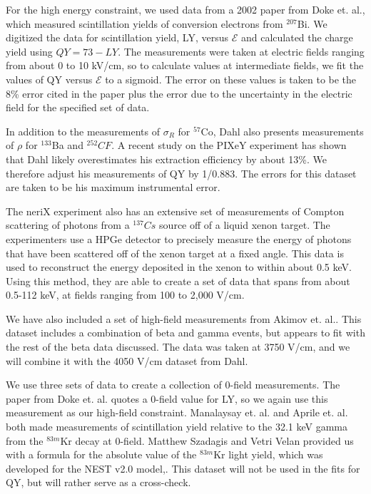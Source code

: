 For the high energy constraint, we used data from a 2002 paper from Doke et. al., which measured scintillation yields of conversion electrons from $^{207}$Bi\cite{doke2002}. We digitized the data for scintillation yield, LY, versus $\mathcal{E}$ and calculated the charge yield using $QY=73-LY$. The measurements were taken at electric fields ranging from about 0 to 10 kV/cm, so to calculate values at intermediate fields, we fit the values of QY versus $\mathcal{E}$ to a sigmoid. The error on these values is taken to be the 8\% error cited in the paper plus the error due to the uncertainty in the electric field for the specified set of data.

In addition to the measurements of $\sigma_R$ for $^{57}$Co, Dahl also presents measurements of $\rho$ for $^{133}$Ba and $^{252}CF$\cite{dahl}. A recent study on the PIXeY experiment has shown that Dahl likely overestimates his extraction efficiency by about 13\%\cite{pixey_extraction}. We therefore adjust his measurements of QY by 1/0.883. The errors for this dataset are taken to be his maximum instrumental error.

The neriX experiment also has an extensive set of measurements of Compton scattering of photons from a $^{137}Cs$ source off of a liquid xenon target\cite{nerix}. The experimenters use a HPGe detector to precisely measure the energy of photons that have been scattered off of the xenon target at a fixed angle. This data is used to reconstruct the energy deposited in the xenon to within about 0.5 keV. Using this method, they are able to create a set of data that spans from about 0.5-112 keV, at fields ranging from 100 to 2,000 V/cm.

We have also included a set of high-field measurements from Akimov et. al.\cite{akimov}. This dataset includes a combination of beta and gamma events, but appears to fit with the rest of the beta data discussed. The data was taken at 3750 V/cm, and we will combine it with the 4050 V/cm dataset from Dahl.

We use three sets of data to create a collection of 0-field measurements. The paper from Doke et. al. quotes a 0-field value for LY, so we again use this measurement as our high-field constraint. Manalaysay et. al. and Aprile et. al. both made measurements of scintillation yield relative to the 32.1 keV gamma from the $^{83m}$Kr decay at 0-field\cite{zerofield1,zerofield2}. Matthew Szadagis and Vetri Velan provided us with a formula for the absolute value of the $^{83m}$Kr light yield, which was developed for the NEST v2.0 model,\cite{matthew}. This dataset will not be used in the fits for QY, but will rather serve as a cross-check.

